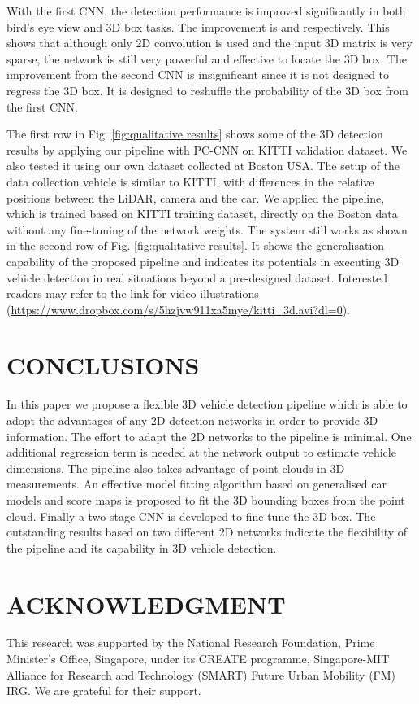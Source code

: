 \documentclass[letterpaper, 10 pt, conference]{ieeeconf}  \usepackage[
\begin{document}
With the first CNN, the detection performance is improved significantly in both bird's eye view and 3D box tasks. The improvement is  and  respectively. This shows that although only 2D convolution is used and the input 3D matrix is very sparse, the network is still very powerful and effective to locate the 3D box. The improvement from the second CNN is insignificant since it is not designed to regress the 3D box. It is designed to reshuffle the probability of the 3D box from the first CNN.








 The first row in Fig. \ref{fig:qualitative results} shows some of the 3D detection results by applying our pipeline with PC-CNN on KITTI validation dataset. We also tested it using our own dataset collected at Boston USA. The setup of the data collection vehicle is similar to KITTI,  with differences in the relative positions between the LiDAR, camera and the car. We applied the pipeline, which is trained based on KITTI training dataset, directly on the Boston data without any fine-tuning of the network weights. The system still works as shown in the second row of Fig. \ref{fig:qualitative results}. It shows the generalisation capability of the proposed pipeline and indicates its potentials in executing 3D vehicle detection in real situations beyond a pre-designed dataset. Interested readers may refer to the link for video illustrations (\url{https://www.dropbox.com/s/5hzjvw911xa5mye/kitti_3d.avi?dl=0}).


\section{CONCLUSIONS}
\label{sec:conclusions}

In this paper we propose a flexible 3D vehicle detection pipeline which is able to adopt the advantages of any 2D detection networks in order to provide 3D information. The effort to adapt the 2D networks to the pipeline is minimal. One additional regression term is needed at the network output to estimate vehicle dimensions. The pipeline also takes advantage of point clouds in 3D measurements. An effective model fitting algorithm based on generalised car models and score maps is proposed to fit the 3D bounding boxes from the point cloud. Finally a two-stage CNN is developed to fine tune the 3D box. The outstanding results based on two different 2D networks indicate the flexibility of the pipeline and its capability in 3D vehicle detection.

\section*{ACKNOWLEDGMENT}
This research was supported by the National Research Foundation, Prime Minister's Office, Singapore, under its CREATE programme, Singapore-MIT Alliance for Research and Technology (SMART) Future Urban Mobility (FM) IRG. We are grateful for their support.

	

\end{document}
